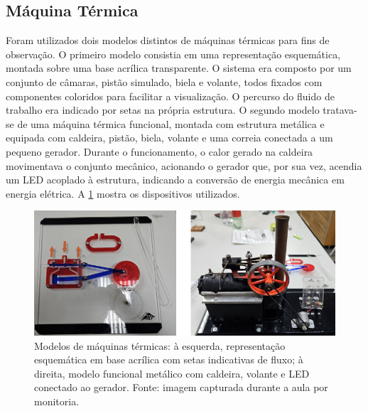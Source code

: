 \subsection{Máquina Térmica}
Foram utilizados dois modelos distintos de máquinas térmicas para fins de observação. O primeiro modelo consistia em uma representação esquemática, montada sobre uma base acrílica transparente. O sistema era composto por um conjunto de câmaras, pistão simulado, biela e volante, todos fixados com componentes coloridos para facilitar a visualização. O percurso do fluido de trabalho era indicado por setas na própria estrutura.
O segundo modelo tratava-se de uma máquina térmica funcional, montada com estrutura metálica e equipada com caldeira, pistão, biela, volante e uma correia conectada a um pequeno gerador. Durante o funcionamento, o calor gerado na caldeira movimentava o conjunto mecânico, acionando o gerador que, por sua vez, acendia um LED acoplado à estrutura, indicando a conversão de energia mecânica em energia elétrica. A \cref{fig:maquina} mostra os dispositivos utilizados.

\begin{figure}[H]
\centering
\includegraphics[width=0.55\linewidth]{fig/maquina.png}
\caption{Modelos de máquinas térmicas: à esquerda, representação esquemática em base acrílica com setas indicativas de fluxo; à direita, modelo funcional metálico com caldeira, volante e LED conectado ao gerador. Fonte: imagem capturada durante a aula por monitoria.}
\label{fig:maquina}
\end{figure}
